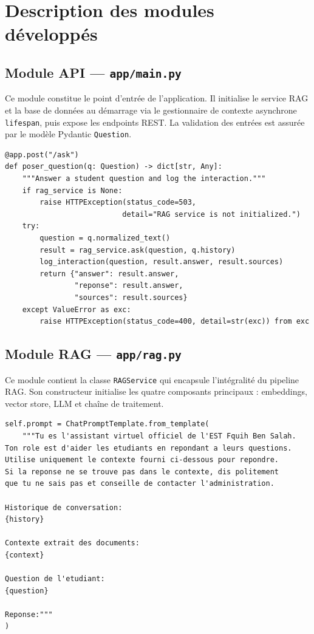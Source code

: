 \documentclass[12pt, a4paper, twoside]{report}
\newcommand{\file}[1]{\texttt{\footnotesize #1}}
\begin{document}
\section{Description des modules développés}

\subsection{Module API --- \file{app/main.py}}

Ce module constitue le point d'entrée de l'application. Il initialise le service RAG et la base de données au démarrage via le gestionnaire de contexte asynchrone \texttt{lifespan}, puis expose les endpoints REST. La validation des entrées est assurée par le modèle Pydantic \texttt{Question}.

\begin{lstlisting}[language=python3, caption={Endpoint principal \texttt{POST /ask}}, label={lst:ask}]
@app.post("/ask")
def poser_question(q: Question) -> dict[str, Any]:
    """Answer a student question and log the interaction."""
    if rag_service is None:
        raise HTTPException(status_code=503,
                           detail="RAG service is not initialized.")
    try:
        question = q.normalized_text()
        result = rag_service.ask(question, q.history)
        log_interaction(question, result.answer, result.sources)
        return {"answer": result.answer,
                "reponse": result.answer,
                "sources": result.sources}
    except ValueError as exc:
        raise HTTPException(status_code=400, detail=str(exc)) from exc
\end{lstlisting}

\subsection{Module RAG --- \file{app/rag.py}}

Ce module contient la classe \texttt{RAGService} qui encapsule l'intégralité du pipeline RAG. Son constructeur initialise les quatre composants principaux : embeddings, vector store, LLM et chaîne de traitement.

\begin{lstlisting}[language=python3, caption={Prompt système du RAG en français}, label={lst:prompt}]
self.prompt = ChatPromptTemplate.from_template(
    """Tu es l'assistant virtuel officiel de l'EST Fquih Ben Salah.
Ton role est d'aider les etudiants en repondant a leurs questions.
Utilise uniquement le contexte fourni ci-dessous pour repondre.
Si la reponse ne se trouve pas dans le contexte, dis politement
que tu ne sais pas et conseille de contacter l'administration.

Historique de conversation:
{history}

Contexte extrait des documents:
{context}

Question de l'etudiant:
{question}

Reponse:"""
)
\end{lstlisting}
\end{document}
